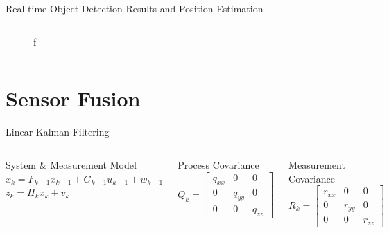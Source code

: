 \documentclass[10pt]{beamer}
\begin{document}
\begin{frame}{Real-time Object Detection Results and Position Estimation}
\begin{columns}
\begin{figure}
         \caption{f}
     \end{figure}  
\end{columns}     
\end{frame}



\section{Sensor Fusion}

\begin{frame}{Linear Kalman Filtering}
   \begin{columns}
        \begin{block}{System \& Measurement Model}
          \centering
          $x_{k}=F_{k-1} x_{k-1}+G_{k-1} u_{k-1}+w_{k-1}$\\
          $z_{k}=H_{k} x_{k}+v_{k}$ 
        \end{block}
        \begin{block}{Process Covariance}
              $$Q_{k} = 
                 \left[\begin{array}{ccc}
                      q_{xx} & 0 & 0 \\
                      0 & q_{yy} & 0 \\
                      0 & 0 & q_{zz}
                      \end{array}\right]$$
        \end{block}
        \begin{block}{Measurement Covariance}
              $$    R_{k} =
                    \left[\begin{array}{ccc}
                          r_{xx} & 0 & 0 \\
                          0 & r_{yy} & 0 \\
                          0 & 0 & r_{zz}
                          \end{array}\right]$$
        \end{block}  
        

\end{columns}
\end{frame}
\end{document}
